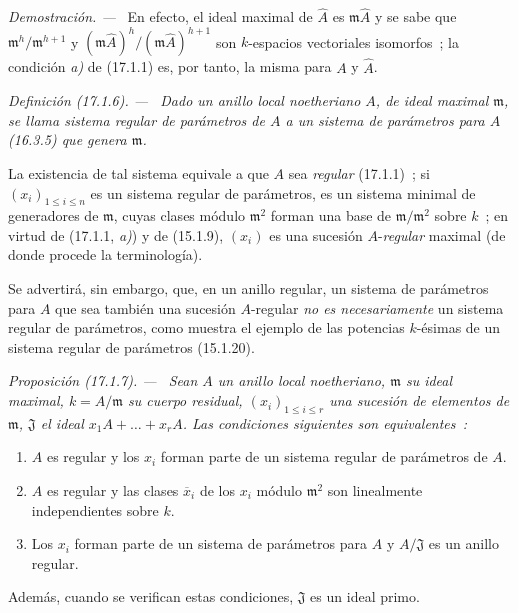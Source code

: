 \documentclass[10pt,oneside]{book}
\makeatletter
\newcommand{\setmanualcurrentlabel}[1]{\def\@currentlabel{#1}}
\newcommand{\oldpage}[2][]{%
  \setcounter{footnote}{0}%
  \marginpar{\scriptsize\textbf{#1}~|~#2}\ignorespaces}
\newenvironment{definition}[1][]{%
  \setmanualcurrentlabel{#1}\par\medskip\noindent\itshape Definición (#1). ---\ }{\par}
\newenvironment{proposition}[1][]{%
  \setmanualcurrentlabel{#1}\par\medskip\noindent\itshape Proposición (#1). ---\ }{\par}
\newenvironment{proof}{%
  \par\medskip\noindent\textit{Demostración. ---\ }}{\par}
\makeatother
\begin{document}
\begin{proof}
\oldpage[0\textsubscript{IV-1}]{41}
En efecto, el ideal maximal de $\widehat{A}$ es $\mathfrak{m}\widehat{A}$ y se
sabe que $\mathfrak{m}^h/\mathfrak{m}^{h+1}$ y
$(\mathfrak{m}\widehat{A})^h/(\mathfrak{m}\widehat{A})^{h+1}$ son
$k$-espacios vectoriales isomorfos~; la condición \emph{a)} de (17.1.1) es, por tanto, la
misma para $A$ y $\widehat{A}$.
\end{proof}

\begin{definition}[17.1.6]
\label{0.17.1.6-es}
Dado un anillo local noetheriano $A$, de ideal maximal $\mathfrak{m}$, se
llama sistema regular de parámetros de $A$ a un sistema de parámetros
para $A$ \textup{(16.3.5)} que genera $\mathfrak{m}$.
\end{definition}

La existencia de tal sistema equivale a que $A$ sea \emph{regular} (17.1.1)~;
si $(x_i)_{1\leq i\leq n}$ es un sistema regular de parámetros, es un
sistema minimal de generadores de $\mathfrak{m}$, cuyas clases módulo
$\mathfrak{m}^2$ forman una base de $\mathfrak{m}/\mathfrak{m}^2$ sobre $k$~;
en virtud de (17.1.1, \emph{a)}) y de (15.1.9), $(x_i)$ es una sucesión $A$-\emph{regular}
maximal (de donde procede la terminología).

Se advertirá, sin embargo, que, en un anillo regular, un sistema de
parámetros para $A$ que sea también una sucesión $A$-regular \emph{no es
necesariamente} un sistema regular de parámetros, como muestra el ejemplo
de las potencias $k$-ésimas de un sistema regular de parámetros (15.1.20).

\begin{proposition}[17.1.7]
\label{0.17.1.7-es}
Sean $A$ un anillo local noetheriano, $\mathfrak{m}$ su ideal maximal,
$k=A/\mathfrak{m}$ su cuerpo residual, $(x_i)_{1\leq i\leq r}$ una sucesión
de elementos de $\mathfrak{m}$, $\mathfrak{J}$ el ideal
$x_1A+\ldots+x_rA$. Las condiciones siguientes son equivalentes~:
\begin{enumerate}
  \item[\rm a)] $A$ es regular y los $x_i$ forman parte de un sistema
  regular de parámetros de $A$.
  \item[\rm a')] $A$ es regular y las clases $\overline{x}_i$ de los $x_i$
  \textup{módulo} $\mathfrak{m}^2$ son linealmente independientes sobre $k$.
  \item[\rm b)] Los $x_i$ forman parte de un sistema de parámetros para $A$ y
  $A/\mathfrak{J}$ es un anillo regular.
\end{enumerate}
Además, cuando se verifican estas condiciones, $\mathfrak{J}$ es un ideal
primo.
\end{proposition}
\end{document}
